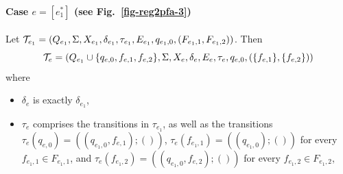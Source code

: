 
\paragraph{Case $e = [e_1^{\ast}]$ (see Fig.~\ref{fig-reg2pfa-3})} 
Let $\mathcal{T}_{e_1} = (Q_{e_1}, \Sigma, X_{e_1}, \delta_{e_1}, \tau_{e_1}, E_{e_1}, q_{e_1,0}, (F_{e_1,1}, F_{e_1,2}))$. Then
\[ \mathcal{T}_e = (Q_{e_1} \cup \{q_{e,0}, f_{e,1}, f_{e,2}\}, \Sigma, X_{e}, \delta_e, E_{e}, \tau_e, q_{e,0}, (\{f_{e,1}\}, \{f_{e,2}\}))\] where 
		\begin{itemize}
			
			\item $\delta_e$ is exactly $\delta_{e_1}$,
%
			\item $\tau_e$ comprises the transitions in $\tau_{e_1}$,  as well as the transitions $\tau_e(q_{e,0}) = ((q_{e_1,0}, f_{e,1}); ())$,  $\tau_e(f_{e_1,1}) = ((q_{e_1,0});())$ for every $f_{e_1,1} \in F_{e_1,1}$, and $\tau_e(f_{e_1,2}) = ((q_{e_1,0}, f_{e,2});())$ for every $f_{e_1,2} \in F_{e_1,2}$, 

\end{itemize}
